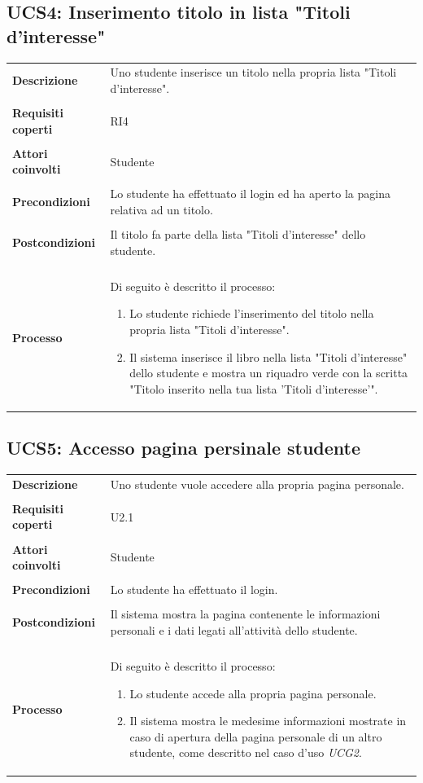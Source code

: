 \documentclass[10pt,a4paper]{report}
\begin{document}
	\subsection{UCS4: Inserimento titolo in lista "Titoli d'interesse"}
	\begin{tabular}{lp{}}
		\textbf{Descrizione}&Uno studente inserisce un titolo nella propria lista "Titoli d'interesse".\\
		\\
		\textbf{Requisiti coperti}&RI4\\
		\\
		\textbf{Attori coinvolti}&Studente\\
		\\
		\textbf{Precondizioni}&Lo studente ha effettuato il login ed ha aperto la pagina relativa ad un titolo.\\
		\\
		\textbf{Postcondizioni}&Il titolo fa parte della lista "Titoli d'interesse" dello studente.\\
		\\
		\textbf{Processo}&Di seguito è descritto il processo:
		\begin{enumerate}
			\item Lo studente richiede l'inserimento del titolo nella propria lista "Titoli d'interesse".
			\item Il sistema inserisce il libro nella lista "Titoli d'interesse" dello studente e mostra un riquadro verde con la scritta "Titolo inserito nella tua  lista 'Titoli d'interesse'".
		\end{enumerate}
	\end{tabular}

	\subsection{UCS5: Accesso pagina persinale studente}
	\begin{tabular}{lp{}}
		\textbf{Descrizione}&Uno studente vuole accedere alla propria pagina personale.\\
		\\
		\textbf{Requisiti coperti}&U2.1\\
		\\
		\textbf{Attori coinvolti}&Studente\\
		\\
		\textbf{Precondizioni}&Lo studente ha effettuato il login.\\
		\\
		\textbf{Postcondizioni}&Il sistema mostra la pagina contenente le informazioni personali e i dati legati all'attività dello studente.\\
		\\
		\textbf{Processo}&Di seguito è descritto il processo:
		\begin{enumerate}
			\item Lo studente accede alla propria pagina personale.
			\item Il sistema mostra le medesime informazioni mostrate in caso di apertura della pagina personale di un altro studente, come descritto nel caso d'uso \textit{UCG2}.
		\end{enumerate}
	\end{tabular}
\end{document}
